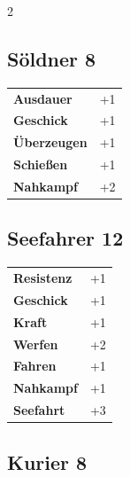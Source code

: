 \begin{multicols}{2}
\begin{tcolorbox}
    \subsection*{Söldner \hfill \small{8 }}
    \tcblower




\begin{tabular}{@{}ll@{}}
    \textbf{Ausdauer} & +1\\
    \textbf{Geschick} & +1\\
    \textbf{Überzeugen} & +1\\
    \textbf{Schießen} & +1\\
    \textbf{Nahkampf} & +2\\
\end{tabular}


\end{tcolorbox}

\begin{tcolorbox}
    \subsection*{Seefahrer \hfill \small{12 }}
    \tcblower




\begin{tabular}{@{}ll@{}}
    \textbf{Resistenz} & +1\\
    \textbf{Geschick} & +1\\
    \textbf{Kraft} & +1\\
    \textbf{Werfen} & +2\\
    \textbf{Fahren} & +1\\
    \textbf{Nahkampf} & +1\\
    \textbf{Seefahrt} & +3\\
\end{tabular}


\end{tcolorbox}

\begin{tcolorbox}
    \subsection*{Kurier \hfill \small{8 }}
    \tcblower





\end{tcolorbox}
\end{multicols}
